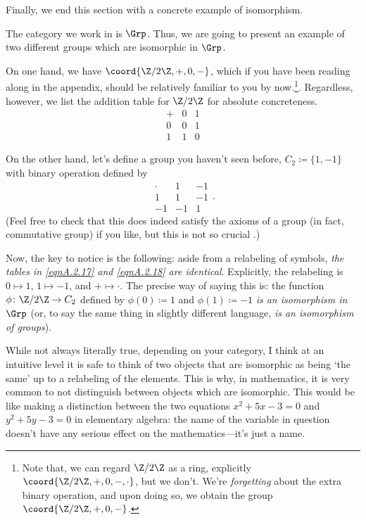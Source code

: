 Finally, we end this section with a concrete example of isomorphism.
\begin{exm}{}{}
The category we work in is $\Grp$.  Thus, we are going to present an example of two different groups which are isomorphic in $\Grp$.

On one hand, we have $\coord{\Z /2\Z,+,0,-}$, which if you have been reading along in the appendix, should be relatively familiar to you by now.\footnote{Note that, we can regard $\Z /2\Z$ as a ring, explicitly $\coord{\Z /2\Z ,+,0,-,\cdot}$, but we don't.  We're \emph{forgetting} about the extra binary operation, and upon doing so, we obtain the group $\coord{\Z /2\Z ,+,0,-}$.}.  Regardless, however, we list the addition table for $\Z /2\Z$ for absolute concreteness.
\begin{equation}\label{eqnA.2.17}
\begin{array}{r|cc}
+ & 0 & 1 \\ \hline
0 & 0 & 1 \\
1 & 1 & 0
\end{array}
\end{equation}

On the other hand, let's define a group you haven't seen before, $C_2\coloneqq \{ 1,-1\}$ with binary operation defined by
\begin{equation}\label{eqnA.2.18}
\begin{array}{r|cc}
\cdot & 1 & -1 \\ \hline
1 & 1 & -1 \\
-1 & -1 & 1
\end{array}.
\end{equation}
(Feel free to check that this does indeed satisfy the axioms of a group (in fact, commutative group) if you like, but this is not so crucial .)

Now, the key to notice is the following: aside from a relabeling of symbols, \emph{the tables in \eqref{eqnA.2.17} and \eqref{eqnA.2.18} are identical}.  Explicitly, the relabeling is $0\mapsto 1$, $1\mapsto -1$, and $+\mapsto \cdot$.  The precise way of saying this is:  the function $\phi \colon \Z /2\Z \rightarrow C_2$ defined by $\phi (0)\coloneqq 1$ and $\phi (1)\coloneqq -1$ \emph{is an isomorphism in $\Grp$} (or, to say the same thing in slightly different language, \emph{is an isomorphism of groups}).

While not always literally true, depending on your category, I think at an intuitive level it is safe to think of two objects that are isomorphic as being `the same' up to a relabeling of the elements.  This is why, in mathematics, it is very common to not distinguish between objects which are isomorphic.  This would be like making a distinction between the two equations $x^2+5x-3=0$ and $y^2+5y-3=0$ in elementary algebra:  the name of the variable in question doesn't have any serious effect on the mathematics---it's just a name.
\end{exm}

